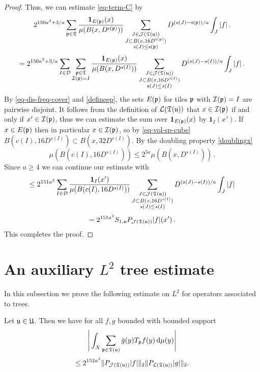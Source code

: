 \begin{proof}
    Thus, we can estimate \eqref{eq-term-C} by
    $$
        2^{150a^3 + 3/a}\sum_{{\mathfrak p}\in \mathfrak{T}}\frac{\mathbf{1}_{E({\mathfrak p})}(x)}{\mu(B(x,D^{{\mathrm{s}}({\mathfrak p})}))}\sum_{\substack{J\in \mathcal{J}({\mathfrak T}({\mathfrak u}))\\J\subset B(x, 16D^{{\mathrm{s}}({\mathfrak p})})\\ s(J) \le {\mathrm{s}}({\mathfrak p})}} D^{(s(J) - {\mathrm{s}}({\mathfrak p}))/a} \int_J |f|\,.
    $$
    $$
        = 2^{150a^3 + 3/a}\sum_{I \in \mathcal{D}} \sum_{\substack{{\mathfrak p}\in \mathfrak{T}\\ {\mathcal{I}}({\mathfrak p}) = I}}\frac{\mathbf{1}_{E({\mathfrak p})}(x)}{\mu(B(x, D^{s(I)}))}\sum_{\substack{J\in \mathcal{J}({\mathfrak T}({\mathfrak u}))\\J\subset B(x, 16 D^{s(I)})\\ s(J) \le s(I)}} D^{(s(J) - s(I))/a} \int_J |f|\,.
    $$
    By \eqref{eq-dis-freq-cover} and \eqref{defineep}, the sets $E({\mathfrak p})$ for tiles ${\mathfrak p}$ with ${\mathcal{I}}({\mathfrak p}) = I$ are pairwise disjoint. It follows from the definition of $\mathcal{L}({\mathfrak T}({\mathfrak u}))$ that $x \in {\mathcal{I}}({\mathfrak p})$ if and only if $x' \in {\mathcal{I}}({\mathfrak p})$, thus we can estimate the sum over $\mathbf{1}_{E({\mathfrak p})}(x)$ by $\mathbf{1}_{I}(x')$.
    If $x \in E({\mathfrak p})$ then in particular $x \in {\mathcal{I}}({\mathfrak p})$, so by \eqref{eq-vol-sp-cube} $B(c(I),16D^{s(I)}) \subset B(x, 32D^{s(I)})$. By the doubling property \eqref{doublingx}
    $$
        \mu(B(c(I), 16D^{s(I)})) \le 2^{5a} \mu(B(x, D^{s(I)}))\,.
    $$
    Since $a \ge 4$ we can continue our estimate with
    $$
        \le 2^{151a^3}\sum_{I \in \mathcal{D}} \frac{\mathbf{1}_{I}(x')}{\mu(B(c(I), 16D^{s(I)}))}\sum_{\substack{J\in \mathcal{J}({\mathfrak T}({\mathfrak u}))\\J\subset B(x, 16 D^{s(I)})\\ s(J) \le s(I)}} D^{(s(J) - s(I))/a} \int_J |f|
    $$
    $$
         = 2^{151a^3} S_{1,{\mathfrak u}} P_{\mathcal{J}({\mathfrak T}({\mathfrak u}))}|f|(x')\,.
    $$
    This completes the proof.
\end{proof}

\section{An auxiliary \texorpdfstring{$L^2$}{L2} tree estimate}

In this subsection we prove the following estimate on $L^2$ for operators associated to trees.

\begin{lemma}
    \label{tree-projection-estimate}
    \leanok
    Let ${\mathfrak u} \in {\mathfrak U}$.
    Then we have for all $f, g$ bounded with bounded support
    $$
        \Bigg|\int_X \sum_{{\mathfrak p} \in {\mathfrak T}({\mathfrak u})} \bar g(y) T_{{\mathfrak p}}f(y) \, \mathrm{d}\mu(y) \Bigg|
    $$
    \begin{equation}
        \label{eq-tree-est}
         \le 2^{152a^3}\|P_{\mathcal{J}({\mathfrak T}({\mathfrak u}))}|f|\|_{2}\|P_{\mathcal{L}({\mathfrak T}({\mathfrak u}))}|g|\|_{2}.
    \end{equation}
\end{lemma}

